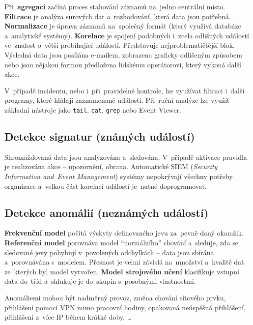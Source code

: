 Při~\textbf{agregaci} začíná proces stahování záznamů na~jedno centrální místo. \textbf{Filtrace} je analýza surových dat a~rozhodování, která data jsou potřebná. \textbf{Normalizace} je úprava záznamů na~společný formát (který využívá databáze a~analytické systémy). \textbf{Korelace} je spojení podobných i~zcela odlišných událostí ve~znalost o~větší probíhající události. Představuje nejproblematičtější blok. Výsledná data jsou posílána e-mailem, zobrazena graficky odlišeným způsobem nebo jsou nějakou formou předložena lidskému operátorovi, který vykoná další akce.

V~případě incidentu, nebo i~při~pravidelné kontrole, lze využívat filtraci i~další programy, které hlídají zaznamenané události. Při~ruční analýze lze využít základní nástroje jako \texttt{tail}, \texttt{cat}, \texttt{grep} nebo Event Viewer.

\subsection{Detekce signatur (známých událostí)}

Shromažďovaná data jsou analyzována a~sledována. V~případě aktivace pravidla je realizována akce -- upozornění, obrana. Automatické SIEM (\emph{Security Information and~Event Management}) systémy nepokrývají všechny potřeby organizace a~velkou část korelací událostí je~nutné doprogramovat.

\subsection{Detekce anomálií (neznámých událostí)}

\textbf{Frekvenční model} počítá výskyty definovaného jevu za~pevně daný okamžik. \textbf{Referenční model} porovnáva model \enquote{normálního} chování a~sleduje, zda se sledované jevy pohybují v~povolených odchylkách -- data jsou sbírána a~porovnávána s~modelem. Přesnost je velmi závislá na~množství a~kvalitě dat ze~kterých byl model vytvořen. \textbf{Model strojového učení} klasifikuje vstupní data do~tříd a~shlukuje je do~skupin s~posobnými vlastnostmi.

Anomáliemi mohou být nadměrný provoz, změna chování síťového prvku, přihlášení pomocí VPN mimo pracovní hodiny, opakovaná neúspěšná přihlášení, přihlášení z~více IP během krátké doby, \dots

